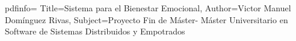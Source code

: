
\def\University{Universidad Politécnica de Madrid\\ Escuela Técnica Superior de Ingeniería de Sistemas Informáticos}
\def\Course{Máster Universitario en Software de Sistemas Distribuidos y Empotrados}
\def\Module{Proyecto Fin de Máster}
\def\ModuleMayus{PROYECTO FIN DE MÁSTER}

\def\Docent{Sandra Gómez Canaval, Gema Bello Orgaz }
\def\DocentMulti{Sandra Gómez Canaval \\ Gema Bello Orgaz }

\def\Title{Sistema para el Bienestar Emocional}
\def\Authors{Victor Manuel Domínguez Rivas}
\def\Shortname{V. Dominguez}
\def\EndDate{Julio de 2023}

\hypersetup
{
	pdfinfo=
	{
		Title={\Title},
		Author={\Authors},
		Subject={\Module - \Course}
	}
}
